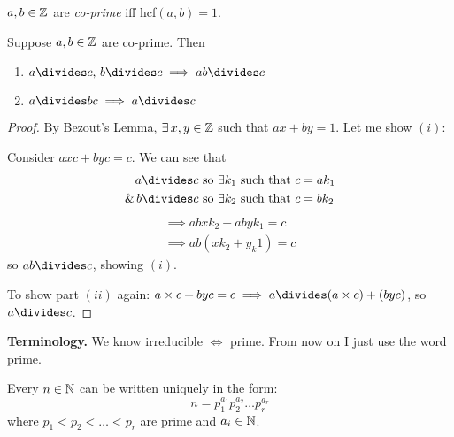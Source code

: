 \documentclass[twoside]{scrartcl}
\begin{document}
\begin{definition}
$a,b \in\mathbb{Z}$ are \emph{co-prime} iff hcf$(a,b) = 1$. 	
\end{definition}

\begin{proposition}
Suppose $a,b \in\mathbb{Z}$ are co-prime. Then
\begin{enumerate}
\item $a\divides c,\, b \divides c \implies ab \divides c$
\item $a \divides bc \implies a \divides c$	
\end{enumerate}
\end{proposition}

\begin{proof}
By Bezout's Lemma, $\exists \, x,y \in\mathbb{Z}$ such that $ax + by = 1$. Let me show $(i)$:

Consider $axc + byc = c$. We can see that 
\[
\begin{aligned}
  a \divides c &\text{ so } \exists k_1 \text{ such that } c = ak_1\\
 \&\, b \divides c &\text{ so } \exists k_2 \text{ such that }  c = bk_2\\
\end{aligned}
\]
\[
\begin{aligned}
  \implies abxk_2 + abyk_1= c\\
  \implies ab(xk_2 + y_k1) = c
\end{aligned}
\]
so $ab \divides c$, showing $(i)$. 

To show part $(ii)$ again: $a \times c + byc = c \implies a \divides (a\times c) + (byc)$, so $a \divides c$.
\end{proof}

\textbf{Terminology.} We know irreducible $\iff$ prime. From now on I just use the word prime.\\

\begin{theorem}
	Every $n \in\mathbb{N}$ can be written uniquely in the form:
	\[n = p_1^{a_1}p_2^{a_2}\dots p_r^{a_r}\]
	where $p_1 < p_2 < \dots < p_r$ are prime and $a_i \in \mathbb{N}$. 
\end{theorem}
\end{document}
